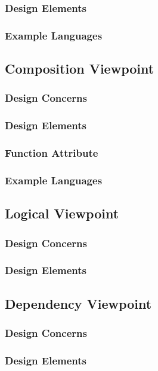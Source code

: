 \documentclass[letterpaper,10pt,titlepage,draftclsnofoot,onecolumn,onesided] {IEEEtran}
\begin{document}
\subsubsection{Design Elements}
\subsubsection{Example Languages}

\subsection{Composition Viewpoint}
\subsubsection{Design Concerns}
\subsubsection{Design Elements}
\subsubsection{Function Attribute}
\subsubsection{Example Languages}

\subsection{Logical Viewpoint}
\subsubsection{Design Concerns}
\subsubsection{Design Elements}


\subsection{Dependency Viewpoint}
\subsubsection{Design Concerns}
\subsubsection{Design Elements}
\end{document}
